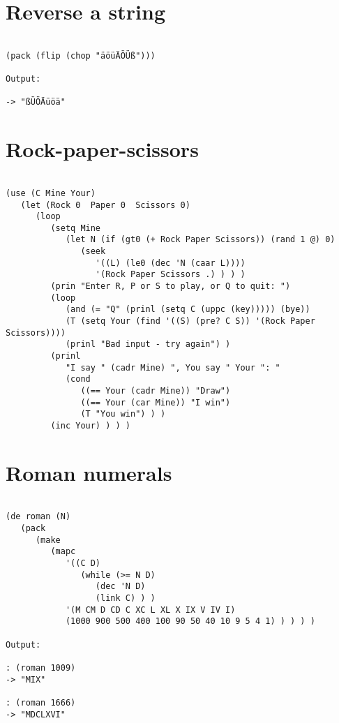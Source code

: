 \section*{Reverse a string}

\begin{verbatim}

(pack (flip (chop "äöüÄÖÜß")))

Output:

-> "ßÜÖÄüöä"

\end{verbatim}

\section*{Rock-paper-scissors}

\begin{verbatim}

(use (C Mine Your)
   (let (Rock 0  Paper 0  Scissors 0)
      (loop
         (setq Mine
            (let N (if (gt0 (+ Rock Paper Scissors)) (rand 1 @) 0)
               (seek
                  '((L) (le0 (dec 'N (caar L))))
                  '(Rock Paper Scissors .) ) ) )
         (prin "Enter R, P or S to play, or Q to quit: ")
         (loop
            (and (= "Q" (prinl (setq C (uppc (key))))) (bye))
            (T (setq Your (find '((S) (pre? C S)) '(Rock Paper Scissors))))
            (prinl "Bad input - try again") )
         (prinl
            "I say " (cadr Mine) ", You say " Your ": "
            (cond
               ((== Your (cadr Mine)) "Draw")
               ((== Your (car Mine)) "I win")
               (T "You win") ) )
         (inc Your) ) ) )

\end{verbatim}

\section*{Roman numerals}

\begin{verbatim}

(de roman (N)
   (pack
      (make
         (mapc
            '((C D)
               (while (>= N D)
                  (dec 'N D)
                  (link C) ) )
            '(M CM D CD C XC L XL X IX V IV I)
            (1000 900 500 400 100 90 50 40 10 9 5 4 1) ) ) ) )

Output:

: (roman 1009)
-> "MIX"

: (roman 1666)
-> "MDCLXVI"

\end{verbatim}

